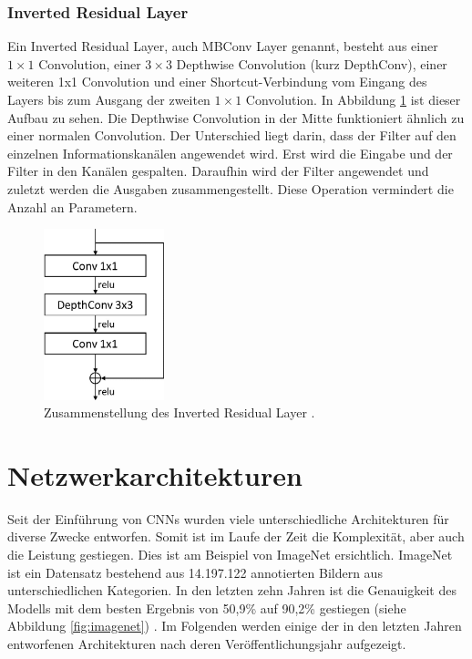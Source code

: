 \subsubsection{Inverted Residual Layer}\label{inv-res-layer-section}
Ein Inverted Residual Layer, auch MBConv Layer genannt, besteht aus einer $1\times1$ Convolution, einer $3\times3$ Depthwise Convolution (kurz DepthConv), einer weiteren 1x1 Convolution und einer Shortcut-Verbindung vom Eingang des Layers bis zum Ausgang der zweiten $1\times1$ Convolution. In Abbildung \ref{fig:mbconv} ist dieser Aufbau zu sehen. Die Depthwise Convolution in der Mitte funktioniert ähnlich zu einer normalen Convolution. Der Unterschied liegt darin, dass der Filter auf den einzelnen Informationskanälen angewendet wird. Erst wird die Eingabe und der Filter in den Kanälen gespalten. Daraufhin wird der Filter angewendet und zuletzt werden die Ausgaben zusammengestellt. Diese Operation vermindert die Anzahl an Parametern. \cite{mobilenetv2}

\begin{figure}[h!]
\centering
\includegraphics[width=3.5cm]{98_images/inverted_residual_layer.png}
\caption{Zusammenstellung des Inverted Residual Layer \cite{mobilenetv2}.}
\label{fig:mbconv}
\end{figure}



%
%
\section{Netzwerkarchitekturen}\label{sec:architekturen-grundlagen}
Seit der Einführung von CNNs wurden viele unterschiedliche Architekturen für diverse Zwecke entworfen. Somit ist im Laufe der Zeit die Komplexität, aber auch die Leistung gestiegen. Dies ist am Beispiel von ImageNet ersichtlich. ImageNet ist ein Datensatz bestehend aus 14.197.122 annotierten Bildern aus unterschiedlichen Kategorien. In den letzten zehn Jahren ist die Genauigkeit des Modells mit dem besten Ergebnis von 50,9\% auf 90,2\% gestiegen (siehe Abbildung \ref{fig:imagenet}) \cite{imagenet-leaderboard}. Im Folgenden werden einige der in den letzten Jahren entworfenen Architekturen nach deren Veröffentlichungsjahr aufgezeigt.


